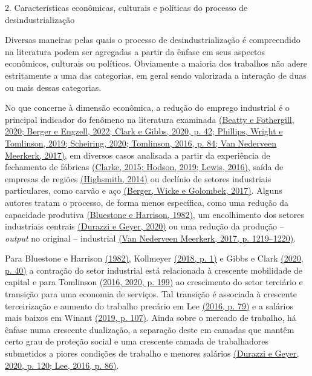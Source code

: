2. Características econômicas, culturais e políticas do processo de
desindustrialização

Diversas maneiras pelas quais o processo de desindustrialização é
compreendido na literatura podem ser agregadas a partir da ênfase em
seus aspectos econômicos, culturais ou políticos. Obviamente a maioria
dos trabalhos não adere estritamente a uma das categorias, em geral
sendo valorizada a interação de duas ou mais dessas categorias.

No que concerne à dimensão econômica, a redução do emprego industrial é
o principal indicador do fenômeno na literatura examinada
\href{https://www.zotero.org/google-docs/?dfS8v8}{(Beatty e Fothergill,
2020; Berger e Engzell, 2022; Clark e Gibbs, 2020, p. 42; Phillips,
Wright e Tomlinson, 2019; Scheiring, 2020; Tomlinson, 2016, p. 84; Van
Nederveen Meerkerk, 2017)}, em diversos casos analisada a partir da
experiência de fechamento de fábricas
\href{https://www.zotero.org/google-docs/?PH688f}{(Clarke, 2015; Hodson,
2019; Lewis, 2016)}, saída de empresas de regiões
\href{https://www.zotero.org/google-docs/?aXSL6s}{(Highsmith, 2014)} ou
declínio de setores industriais particulares, como carvão e aço
\href{https://www.zotero.org/google-docs/?AU5O44}{(Berger, Wicke e
Golombek, 2017)}. Alguns autores tratam o processo, de forma menos
específica, como uma redução da capacidade produtiva
\href{https://www.zotero.org/google-docs/?AHGVw8}{(Bluestone e Harrison,
1982)}, um encolhimento dos setores industriais centrais
\href{https://www.zotero.org/google-docs/?kdGwX7}{(Durazzi e Geyer,
2020)} ou uma redução da produção -- \emph{output} no original --
industrial \href{https://www.zotero.org/google-docs/?l64MF9}{(Van
Nederveen Meerkerk, 2017, p. 1219--1220)}.

Para Bluestone e Harrison
\href{https://www.zotero.org/google-docs/?CdGPle}{(1982)}, Kollmeyer
\href{https://www.zotero.org/google-docs/?goGCB5}{(2018, p. 1)} e Gibbs
e Clark \href{https://www.zotero.org/google-docs/?jifGFI}{(2020, p. 40)}
a contração do setor industrial está relacionada à crescente mobilidade
de capital e para Tomlinson
\href{https://www.zotero.org/google-docs/?mcJpA6}{(2016, 2020, p. 199)}
ao crescimento do setor terciário e transição para uma economia de
serviços. Tal transição é associada à crescente terceirização e aumento
do trabalho precário em Lee
\href{https://www.zotero.org/google-docs/?M0nGdv}{(2016, p. 79)} e a
salários mais baixos em Winant
\href{https://www.zotero.org/google-docs/?TV45XC}{(2019, p. 107)}. Ainda
sobre o mercado de trabalho, há ênfase numa crescente dualização, a
separação deste em camadas que mantêm certo grau de proteção social e
uma crescente camada de trabalhadores submetidos a piores condições de
trabalho e menores salários
\href{https://www.zotero.org/google-docs/?Z0WlY5}{(Durazzi e Geyer,
2020, p. 120; Lee, 2016, p. 86)}.

